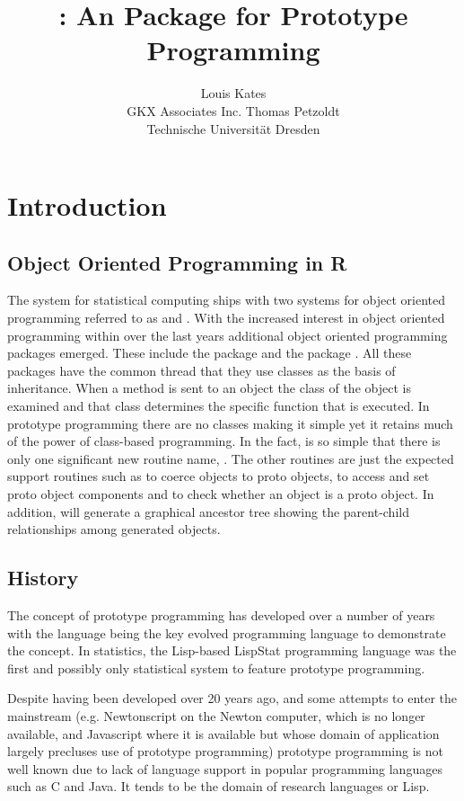 \documentclass{Z}
\author{Louis Kates\\GKX Associates Inc. \And
        Thomas Petzoldt\\Technische Universit\"at Dresden}
\title{\pkg{proto}: An \proglang{R} Package for Prototype Programming}
\begin{document}
\section{Introduction} \label{sec:intro}

\subsection{Object Oriented Programming in R}

The  system for statistical computing
\citep[\url{http://www.R-project.org/}]{Rcore2005} ships with two
systems for object oriented programming referred to as 
and .  With the increased interest in object oriented
programming within  over the last years additional object
oriented programming packages emerged.  These include the 
package \citep{Bengtsson2003} and the  package
\citep[\url{http://www.omegahat.org/OOP/}]{Rnews:Chambers+Lang:2001a}.
All these packages have the common thread that they use
classes as the basis of inheritance.  When a method is sent to an
object the class of the object is examined and that class determines the
specific function that is executed. In prototype programming there
are no classes making it simple yet it retains much of the power of
class-based programming.  In the fact,  is so simple that
there is only one significant new routine name, .  The
other routines are just the expected support routines such as
 to coerce objects to proto objects, \code{\$} to
access and set proto object components and  to check
whether an object is a proto object.  In addition, 
will generate a graphical ancestor tree showing the parent-child
relationships among generated  objects.

\subsection{History}

The concept of 
prototype programming
\citep{Lieberman1986, Taivalsaari1996a, Noble1999}
has developed over a number of years with the 
language \citep{Agesen1992}
being the key evolved programming language to demonstrate
the concept.  In statistics, the Lisp-based
LispStat programming language \citep{Tierney1990} was
the first and possibly only statistical system to feature prototype 
programming.

Despite having been developed over 20 years ago, and some attempts to
enter the mainstream (e.g.  Newtonscript on the Newton computer, which
is no longer available, and Javascript where it is available but whose
domain of application largely precluses use of prototype programming)
prototype programming is not well known due to lack of language
support in popular programming languages such as C and Java.  It tends
to be the domain of research languages or Lisp.
\end{document}
